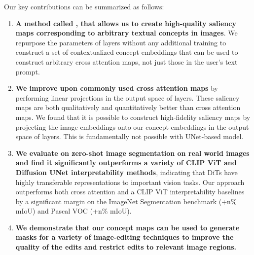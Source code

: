 Our key contributions can be summarized as follows:
\begin{enumerate}
    \item \textbf{A method called \tool{}, that allows us to create high-quality saliency maps corresponding to arbitrary textual concepts in images}.
    We repurpose the parameters of \layername{} layers without any additional training to construct a set of contextualized concept embeddings that can be used to construct arbitrary cross attention maps, not just those in the user's text prompt. 
    
    
    \item \textbf{We improve upon commonly used cross attention maps} by performing linear projections in the output space of \layername{} layers. These saliency maps are both qualitatively and quantitatively better than cross attention maps. 
    We found that it is possible to construct high-fidelity saliency maps by projecting the image embeddings onto our concept embeddings in the output space of \layername{} layers. This is fundamentally not possible with UNet-based model.

    \item \textbf{We evaluate \tool{} on zero-shot image segmentation on real world images and find it significantly outperforms a variety of CLIP ViT and Diffusion UNet interpretability methods}, indicating that DiTs have highly transferable representations to important vision tasks. 
    Our approach outperforms both cross attention and a CLIP ViT interpretability baselines by a significant margin on the ImageNet Segmentation benchmark (+n\% mIoU) and Pascal VOC (+n\% mIoU). 
    
    \item \textbf{We demonstrate that our concept maps can be used to generate masks for a variety of image-editing techniques to improve the quality of the edits and restrict edits to relevant image regions. } 
\end{enumerate}

